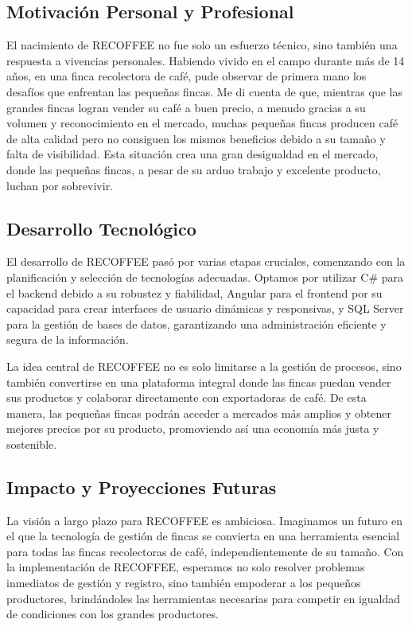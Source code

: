 \documentclass[12pt]{article}
\begin{document}
\subsection{Motivación Personal y Profesional}

El nacimiento de RECOFFEE no fue solo un esfuerzo técnico, sino también una respuesta a vivencias personales. Habiendo vivido en el campo durante más de 14 años, en una finca recolectora de café, pude observar de primera mano los desafíos que enfrentan las pequeñas fincas. Me di cuenta de que, mientras que las grandes fincas logran vender su café a buen precio, a menudo gracias a su volumen y reconocimiento en el mercado, muchas pequeñas fincas producen café de alta calidad pero no consiguen los mismos beneficios debido a su tamaño y falta de visibilidad. Esta situación crea una gran desigualdad en el mercado, donde las pequeñas fincas, a pesar de su arduo trabajo y excelente producto, luchan por sobrevivir.

\subsection{Desarrollo Tecnológico}

El desarrollo de RECOFFEE pasó por varias etapas cruciales, comenzando con la planificación y selección de tecnologías adecuadas. Optamos por utilizar C# para el backend debido a su robustez y fiabilidad, Angular para el frontend por su capacidad para crear interfaces de usuario dinámicas y responsivas, y SQL Server para la gestión de bases de datos, garantizando una administración eficiente y segura de la información.

La idea central de RECOFFEE no es solo limitarse a la gestión de procesos, sino también convertirse en una plataforma integral donde las fincas puedan vender sus productos y colaborar directamente con exportadoras de café. De esta manera, las pequeñas fincas podrán acceder a mercados más amplios y obtener mejores precios por su producto, promoviendo así una economía más justa y sostenible.

\subsection{Impacto y Proyecciones Futuras}

La visión a largo plazo para RECOFFEE es ambiciosa. Imaginamos un futuro en el que la tecnología de gestión de fincas se convierta en una herramienta esencial para todas las fincas recolectoras de café, independientemente de su tamaño. Con la implementación de RECOFFEE, esperamos no solo resolver problemas inmediatos de gestión y registro, sino también empoderar a los pequeños productores, brindándoles las herramientas necesarias para competir en igualdad de condiciones con los grandes productores.
\end{document}
